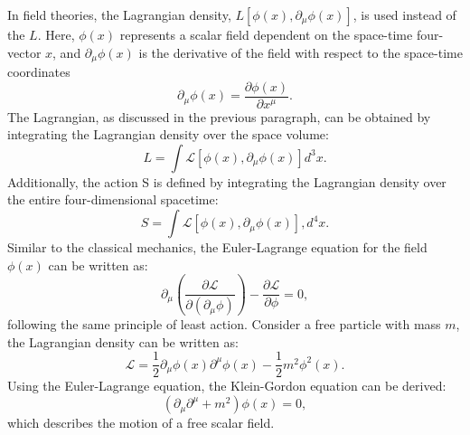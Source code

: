             In field theories, the Lagrangian density, $L[\phi(x), \partial_{\mu}\phi(x)]$, is used instead of the $L$. 
            Here, $\phi(x)$ represents a scalar field dependent on the space-time four-vector $x$, 
            and $\partial_{\mu}\phi(x)$ is the derivative of the field with respect to the space-time coordinates
            \begin{equation}
                \partial_{\mu}\phi(x) = \frac{\partial \phi(x)}{\partial x^{\mu}}.
            \end{equation}
            The Lagrangian, as discussed in the previous paragraph, can be obtained by integrating the Lagrangian density over the space volume:
            \begin{equation}
                L = \int \mathcal{L}[\phi(x), \partial_{\mu}\phi(x)] d^{3}x.
            \end{equation}
            Additionally, the action S is defined by integrating the Lagrangian density over the entire four-dimensional spacetime:
            \begin{equation}
            S = \int \mathcal{L}[\phi(x), \partial_{\mu}\phi(x)] , d^{4}x.
            \end{equation}
            Similar to the classical mechanics, the Euler-Lagrange equation for the field $\phi(x)$ can be written as:
            \begin{equation}
                \partial_{\mu}(\frac{\partial \mathcal{L}}{\partial(\partial_\mu \phi)}) - \frac{\partial \mathcal{L}}{\partial \phi} = 0,
            \end{equation}
            following the same principle of least action. 
            Consider a free particle with mass $m$, the Lagrangian density can be written as:
            \begin{equation}
                \mathcal{L} = \frac{1}{2} \partial_{\mu}\phi(x) \partial^{\mu}\phi(x) - \frac{1}{2} m^{2} \phi^{2}(x).
            \end{equation}
            Using the Euler-Lagrange equation, the Klein-Gordon equation can be derived:
            \begin{equation}
                (\partial_{\mu}\partial^{\mu} + m^{2})\phi(x) = 0,
            \end{equation}
            which describes the motion of a free scalar field.
